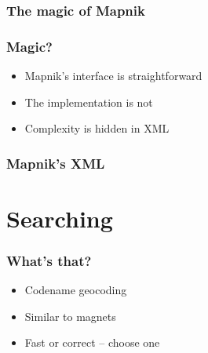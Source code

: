 \documentclass[14pt]{beamer}
\begin{document}
\begin{frame}
  \frametitle{The magic of Mapnik}
  
\end{frame}

\begin{frame}
  \frametitle{Magic?}
  \begin{itemize}
  \item Mapnik's interface is straightforward
  \item The implementation is not
  \item Complexity is hidden in XML
  \end{itemize}
\end{frame}

\begin{frame}
  \frametitle{Mapnik's XML}
\end{frame}


%     
%     
%     



\section{Searching}

\begin{frame}
  \frametitle{What's that?}
  \begin{itemize}
  \item Codename geocoding
  \item Similar to magnets
  \item Fast or correct -- choose one
  \end{itemize}
\end{frame}
\end{document}
